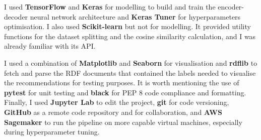 I used \textbf{TensorFlow} and \textbf{Keras} for modelling to build and train the encoder-decoder neural network architecture
and \textbf{Keras Tuner} for hyperparameters optimisation. I also used \textbf{Scikit-learn} but not for modelling.
It provided utility functions for the dataset splitting and the cosine similarity calculation,
and I was already familiar with its API.

I used a combination of \textbf{Matplotlib} and \textbf{Seaborn} for visualisation and \textbf{rdflib} to fetch and parse the RDF documents
that contained the labels needed to visualise the recommendations for testing purposes.
It is worth mentioning the use of \textbf{pytest} for unit testing and \textbf{black} for PEP 8 code compliance and formatting.
Finally, I used \textbf{Jupyter Lab} to edit the project, \textbf{git} for code versioning, \textbf{GitHub} as a remote code repository
and for collaboration, and \textbf{AWS Sagemaker} to run the pipeline on more capable virtual machines, especially during hyperparameter tuning.
